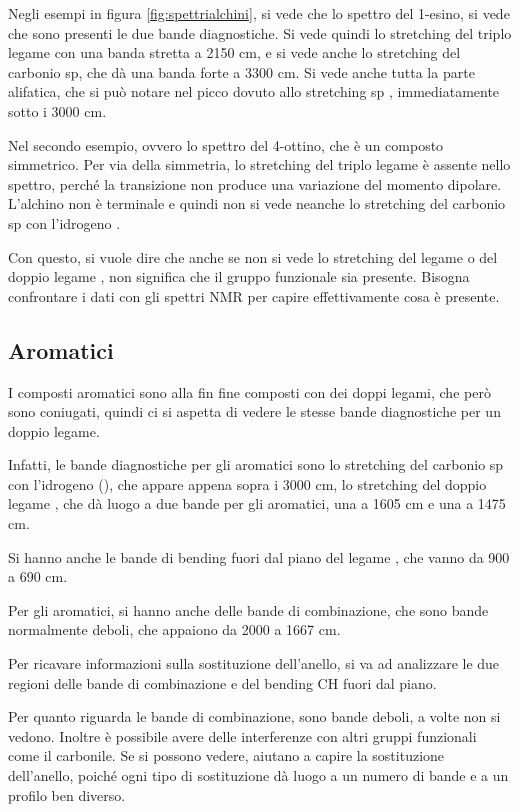 Negli esempi in figura \ref{fig:spettrialchini}, si vede che lo spettro del 1-esino, si vede che sono
presenti le due bande diagnostiche. Si vede quindi lo stretching del
triplo legame  con una banda stretta a 2150 cm, e si vede
anche lo stretching  del carbonio sp, che dà una banda forte a 3300
cm. Si vede anche tutta la parte alifatica, che si può notare nel
picco dovuto allo stretching sp , immediatamente sotto i 3000 cm.

Nel secondo esempio, ovvero lo spettro del 4-ottino, che è un composto
simmetrico. Per via della simmetria, lo stretching del triplo legame
 è assente nello spettro, perché la transizione non produce una
variazione del momento dipolare. L'alchino non è terminale e quindi non
si vede neanche lo stretching del carbonio sp con l'idrogeno .

Con questo, si vuole dire che anche se non si vede lo stretching del
legame  o del doppio legame , non significa che il gruppo
funzionale sia presente. Bisogna confrontare i dati con gli spettri NMR
per capire effettivamente cosa è presente.

\subsection{Aromatici}

I composti aromatici sono alla fin fine composti con dei doppi legami,
che però sono coniugati, quindi ci si aspetta di vedere le stesse bande
diagnostiche per un doppio legame.

Infatti, le bande diagnostiche per gli aromatici sono lo stretching del
carbonio sp con l'idrogeno (), che appare appena sopra i 3000 cm,
lo stretching del doppio legame , che dà luogo a due bande per gli
aromatici, una a 1605 cm e una a 1475 cm.

Si hanno anche le bande di bending fuori dal piano del legame , che
vanno da 900 a 690 cm.

Per gli aromatici, si hanno anche delle bande di combinazione, che sono
bande normalmente deboli, che appaiono da 2000 a 1667 cm.

Per ricavare informazioni sulla sostituzione dell'anello, si va ad
analizzare le due regioni delle bande di combinazione e del bending CH
fuori dal piano.

Per quanto riguarda le bande di combinazione, sono bande deboli, a volte
non si vedono. Inoltre è possibile avere delle interferenze con altri
gruppi funzionali come il carbonile. Se si possono vedere, aiutano a
capire la sostituzione dell'anello, poiché ogni tipo di sostituzione dà
luogo a un numero di bande e a un profilo ben diverso.

